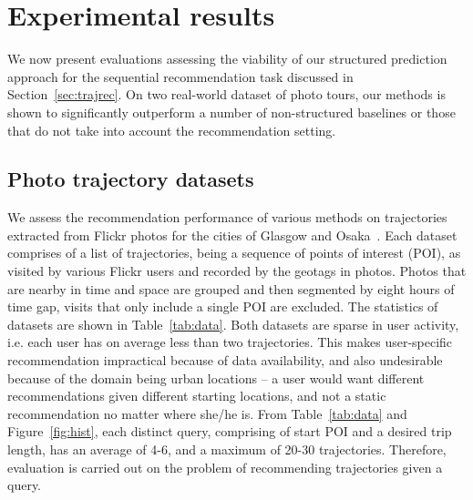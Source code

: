 
\secmoveup
\section{Experimental results}
\label{sec:experiment}
\textmoveup

We now present evaluations assessing the viability of our structured prediction approach
for the sequential recommendation task discussed in Section~\ref{sec:trajrec}.
On two real-world dataset of photo tours, our methods is shown to significantly outperform
a number of non-structured baselines or those that do not take into account the recommendation setting.


\secmoveup
\subsection{Photo trajectory datasets}
\label{sec:dataset}
\textmoveup

We assess the recommendation performance %
of various methods
on trajectories extracted from Flickr photos
for the cities of Glasgow and Osaka~\cite{thomee2016yfcc100m,ijcai15}.
Each dataset comprises of a
list of trajectories, being a sequence of points of interest (POI), as visited by various Flickr users
and recorded by the geotags in photos. Photos that are nearby in time and space are grouped and then segmented by eight hours of time gap, visits that only include a single POI are excluded.
The statistics of datasets are shown in Table~\ref{tab:data}.
Both datasets are sparse in user activity,
i.e. each user has on average less than two trajectories.
This makes user-specific recommendation impractical because of
data availability, and also undesirable because of the domain being urban locations
-- a user would want different recommendations given different starting locations, and not a static recommendation no matter where she/he is.
From Table~\ref{tab:data} and Figure~\ref{fig:hist},
each distinct query, comprising of start POI and a desired trip length,
has an average of 4-6, and a maximum of 20-30 trajectories.
Therefore, evaluation is carried out on the problem of recommending trajectories given a query.

